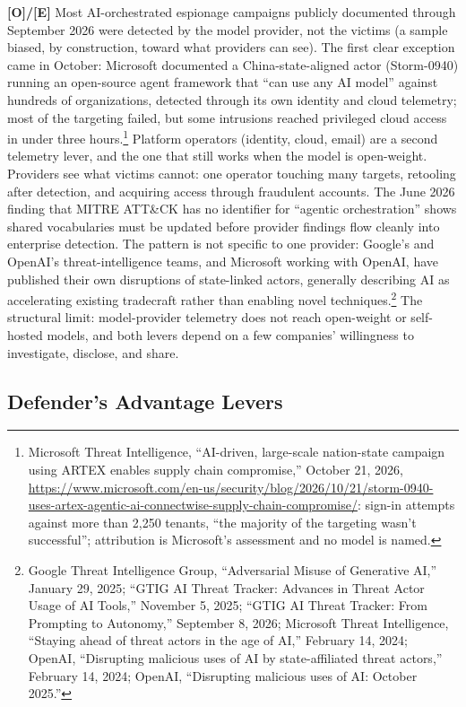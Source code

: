 \documentclass[11pt,letterpaper]{article}
\begin{document}
\textbf{[O]/[E]} Most AI-orchestrated espionage campaigns publicly documented through September 2026 were detected by the model provider, not the victims (a sample biased, by construction, toward what providers can see). The first clear exception came in October: Microsoft documented a China-state-aligned actor (Storm-0940) running an open-source agent framework that ``can use any AI model'' against hundreds of organizations, detected through its own identity and cloud telemetry; most of the targeting failed, but some intrusions reached privileged cloud access in under three hours.\footnote{Microsoft Threat Intelligence, ``AI-driven, large-scale nation-state campaign using ARTEX enables supply chain compromise,'' October 21, 2026, \url{https://www.microsoft.com/en-us/security/blog/2026/10/21/storm-0940-uses-artex-agentic-ai-connectwise-supply-chain-compromise/}: sign-in attempts against more than 2,250 tenants, ``the majority of the targeting wasn't successful''; attribution is Microsoft's assessment and no model is named.} Platform operators (identity, cloud, email) are a second telemetry lever, and the one that still works when the model is open-weight. Providers see what victims cannot: one operator touching many targets, retooling after detection, and acquiring access through fraudulent accounts. The June 2026 finding that MITRE ATT\&CK has no identifier for ``agentic orchestration'' shows shared vocabularies must be updated before provider findings flow cleanly into enterprise detection. The pattern is not specific to one provider: Google's and OpenAI's threat-intelligence teams, and Microsoft working with OpenAI, have published their own disruptions of state-linked actors, generally describing AI as accelerating existing tradecraft rather than enabling novel techniques.\footnote{Google Threat Intelligence Group, ``Adversarial Misuse of Generative AI,'' January 29, 2025; ``GTIG AI Threat Tracker: Advances in Threat Actor Usage of AI Tools,'' November 5, 2025; ``GTIG AI Threat Tracker: From Prompting to Autonomy,'' September 8, 2026; Microsoft Threat Intelligence, ``Staying ahead of threat actors in the age of AI,'' February 14, 2024; OpenAI, ``Disrupting malicious uses of AI by state-affiliated threat actors,'' February 14, 2024; OpenAI, ``Disrupting malicious uses of AI: October 2025.''} The structural limit: model-provider telemetry does not reach open-weight or self-hosted models, and both levers depend on a few companies' willingness to investigate, disclose, and share.

\subsection{Defender's Advantage Levers}
\end{document}
